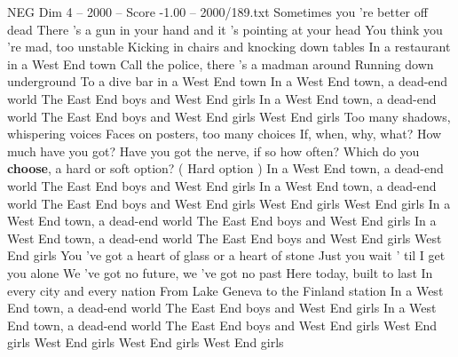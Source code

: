 \begin{textsample}{NEG Dim 4 – 2000 – Score -1.00 – 2000/189.txt}  \label{ex:f4_neg_034}
Sometimes you 're better off dead There 's a gun in your hand and it 's pointing at your head You think you 're mad, too unstable Kicking in chairs and knocking down tables In a restaurant in a West End town Call the police, there 's a madman around Running down underground To a dive bar in a West End town In a West End town, a dead-end world The East End boys and West End girls In a West End town, a dead-end world The East End boys and West End girls West End girls Too many shadows, whispering voices Faces on posters, too many choices If, when, why, what?
How much have you got?
Have you got the nerve, if so how often?
Which do you \textbf{choose}, a hard or soft option? ( Hard option ) In a West End town, a dead-end world The East End boys and West End girls In a West End town, a dead-end world The East End boys and West End girls West End girls West End girls In a West End town, a dead-end world The East End boys and West End girls In a West End town, a dead-end world The East End boys and West End girls West End girls You 've got a heart of glass or a heart of stone Just you wait ' til I get you alone We 've got no future, we 've got no past Here today, built to last In every city and every nation From Lake Geneva to the Finland station In a West End town, a dead-end world The East End boys and West End girls In a West End town, a dead-end world The East End boys and West End girls West End girls West End girls West End girls West End girls

\end{textsample}
